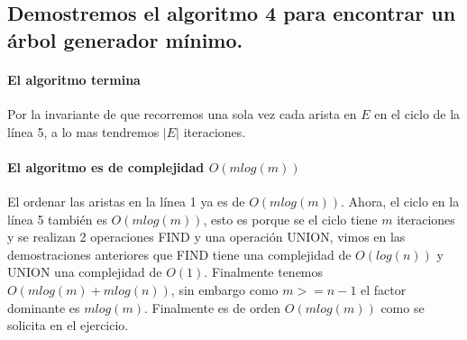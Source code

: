 \documentclass[12pt]{article}
\begin{document}
\subsection{Demostremos el algoritmo 4 para encontrar un árbol generador mínimo.}
\paragraph{El algoritmo termina}
Por la invariante de que recorremos una sola vez cada arista en $E$ en el ciclo de la línea 5, a lo mas tendremos $|E|$ iteraciones.
\paragraph{El algoritmo es de complejidad $O(mlog(m))$}
El ordenar las aristas en la línea 1 ya es de $O(mlog(m))$. Ahora, el ciclo en la línea 5 también es $O(mlog(m))$, esto es porque se el ciclo tiene $m$ iteraciones y se realizan 2 operaciones FIND y una operación UNION, vimos en las demostraciones anteriores que FIND tiene una complejidad de $O(log(n))$ y UNION una complejidad de $O(1)$. Finalmente tenemos $O(mlog(m) + mlog(n))$, sin embargo como $m>=n-1$ el factor dominante es $mlog(m)$. Finalmente es de orden $O(mlog(m))$ como se solicita en el ejercicio.
\end{document}
